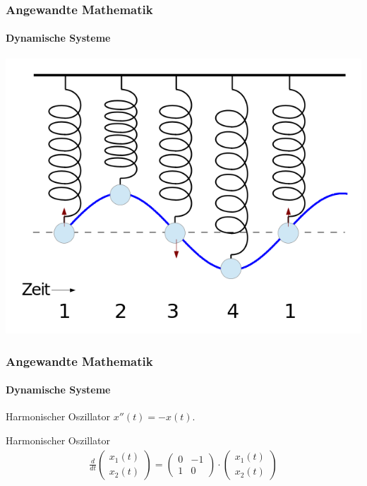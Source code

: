 \documentclass{beamer}
\begin{document}
\begin{frame}
    \frametitle{Angewandte Mathematik}
\framesubtitle{Dynamische Systeme }
\center
\includegraphics[scale=0.35]{images/federpendel}

 \end{frame}




\begin{frame}
    \frametitle{Angewandte Mathematik}
\framesubtitle{Dynamische Systeme }
\begin{block}{Harmonischer Oszillator}
$x''(t) = -x(t)$.
\end{block}
\begin{block}{Harmonischer Oszillator}
\begin{align*}
    \frac{d}{dt}\begin{pmatrix}
        x_1(t) \\ x_2(t)
    \end{pmatrix} = 
\begin{pmatrix}
    0 & -1  \\ 1 & 0
\end{pmatrix} \cdot
\begin{pmatrix} 
    x_1(t) \\ x_2(t)
\end{pmatrix} 
\end{align*}
\end{block}
 \end{frame}
\end{document}
